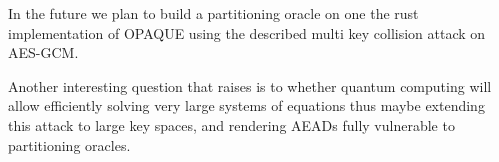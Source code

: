 In the future we plan to build a partitioning oracle on one the rust implementation of OPAQUE\cite{opaque} using the
described multi key collision attack on AES-GCM\@.

Another interesting question that raises is to whether quantum computing will allow efficiently solving very large
systems of equations thus maybe extending this attack to large key spaces, and rendering AEADs fully
vulnerable to partitioning oracles.